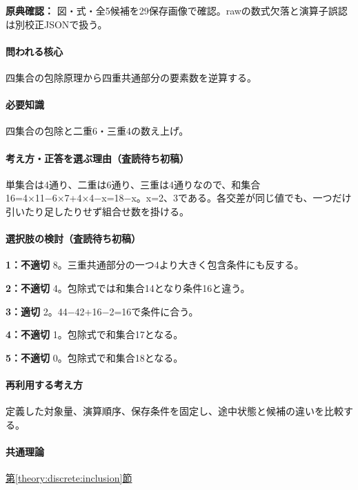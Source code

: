\noindent\textbf{原典確認：} 図・式・全5候補を29保存画像で確認。rawの数式欠落と演算子誤認は別校正JSONで扱う。\par

\paragraph{問われる核心} 四集合の包除原理から四重共通部分の要素数を逆算する。

\paragraph{必要知識} 四集合の包除と二重6・三重4の数え上げ。

\paragraph{考え方・正答を選ぶ理由（査読待ち初稿）} 単集合は4通り、二重は6通り、三重は4通りなので、和集合16=\allowbreak{}4×11−6×7+4×4−x=\allowbreak{}18−x。x=\allowbreak{}2、3である。各交差が同じ値でも、一つだけ引いたり足したりせず組合せ数を掛ける。

\paragraph{選択肢の検討（査読待ち初稿）}\mbox{}\par

\noindent\textbf{1：不適切} 8。三重共通部分の一つ4より大きく包含条件にも反する。\par

\noindent\textbf{2：不適切} 4。包除式では和集合14となり条件16と違う。\par

\noindent\textbf{3：適切} 2。44−42+16−2=\allowbreak{}16で条件に合う。\par

\noindent\textbf{4：不適切} 1。包除式で和集合17となる。\par

\noindent\textbf{5：不適切} 0。包除式で和集合18となる。\par

\paragraph{再利用する考え方} 定義した対象量、演算順序、保存条件を固定し、途中状態と候補の違いを比較する。

\paragraph{共通理論} \hyperref[theory:discrete:inclusion]{第\ref*{theory:discrete:inclusion}節}

